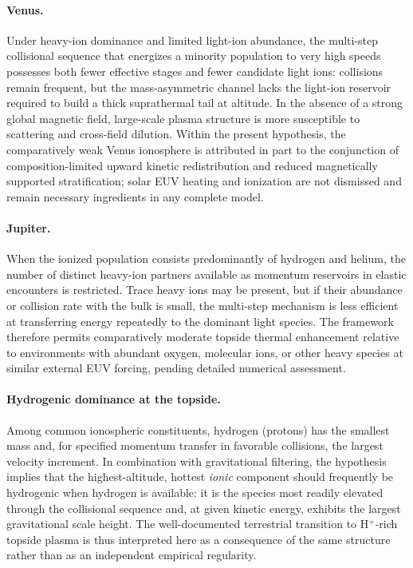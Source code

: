 \documentclass[11pt,a4paper]{article}
\begin{document}
\paragraph{Venus.}
Under heavy-ion dominance and limited light-ion abundance, the multi-step collisional sequence that energizes a minority population to very high speeds possesses both fewer effective stages and fewer candidate light ions: collisions remain frequent, but the mass-asymmetric channel lacks the light-ion reservoir required to build a thick suprathermal tail at altitude. In the absence of a strong global magnetic field, large-scale plasma structure is more susceptible to scattering and cross-field dilution. Within the present hypothesis, the comparatively weak Venus ionosphere is attributed in part to the conjunction of composition-limited upward kinetic redistribution and reduced magnetically supported stratification; solar EUV heating and ionization are not dismissed and remain necessary ingredients in any complete model.

\paragraph{Jupiter.}
When the ionized population consists predominantly of hydrogen and helium, the number of distinct heavy-ion partners available as momentum reservoirs in elastic encounters is restricted. Trace heavy ions may be present, but if their abundance or collision rate with the bulk is small, the multi-step mechanism is less efficient at transferring energy repeatedly to the dominant light species. The framework therefore permits comparatively moderate topside thermal enhancement relative to environments with abundant oxygen, molecular ions, or other heavy species at similar external EUV forcing, pending detailed numerical assessment.

\paragraph{Hydrogenic dominance at the topside.}
Among common ionospheric constituents, hydrogen (protons) has the smallest mass and, for specified momentum transfer in favorable collisions, the largest velocity increment. In combination with gravitational filtering, the hypothesis implies that the highest-altitude, hottest \emph{ionic} component should frequently be hydrogenic when hydrogen is available: it is the species most readily elevated through the collisional sequence and, at given kinetic energy, exhibits the largest gravitational scale height. The well-documented terrestrial transition to H$^+$-rich topside plasma is thus interpreted here as a consequence of the same structure rather than as an independent empirical regularity.
\end{document}
